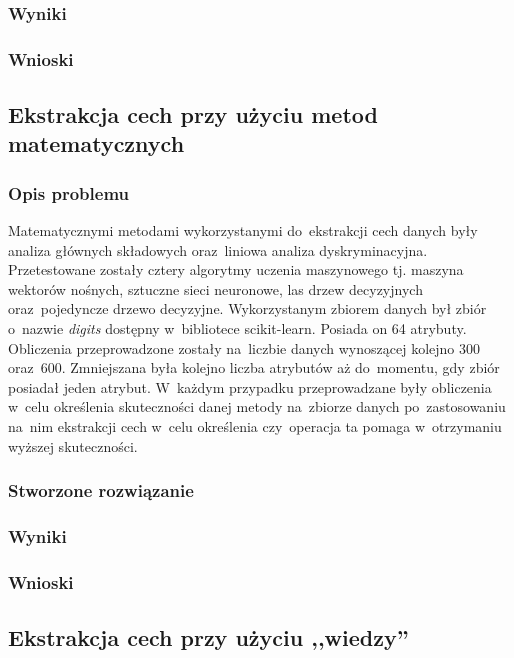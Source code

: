 \subsubsection{Wyniki}
\subsubsection{Wnioski}

\subsection{Ekstrakcja cech przy użyciu metod matematycznych}

\subsubsection{Opis problemu}
Matematycznymi metodami wykorzystanymi do~ekstrakcji cech danych były analiza głównych składowych oraz~liniowa analiza dyskryminacyjna. Przetestowane zostały cztery algorytmy uczenia maszynowego tj. maszyna wektorów nośnych, sztuczne sieci neuronowe, las drzew decyzyjnych oraz~pojedyncze drzewo decyzyjne. Wykorzystanym zbiorem danych był zbiór o~nazwie \textit{digits} dostępny w~bibliotece scikit-learn. Posiada on 64 atrybuty. Obliczenia przeprowadzone zostały na~liczbie danych wynoszącej kolejno 300 oraz~600. Zmniejszana była kolejno liczba atrybutów aż do~momentu, gdy zbiór posiadał jeden atrybut. W~każdym przypadku przeprowadzane były obliczenia w~celu określenia skuteczności danej metody na~zbiorze danych po~zastosowaniu na~nim ekstrakcji cech w~celu określenia czy~operacja ta pomaga w~otrzymaniu wyższej skuteczności.

\subsubsection{Stworzone rozwiązanie}
\subsubsection{Wyniki}
\subsubsection{Wnioski}

\subsection{Ekstrakcja cech przy użyciu ,,wiedzy''}
